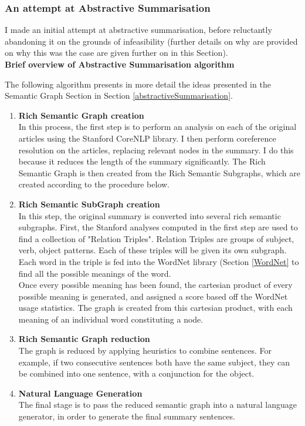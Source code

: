 \documentclass[12pt]{article}
\begin{document}
\subsubsection{An attempt at Abstractive Summarisation}

\label{abstractiveimplementation}

I made an initial attempt at abstractive summarisation, before reluctantly abandoning it on the grounds of infeasibility (further details on why are provided on why this was the case are given further on in this Section). \\

\textbf{Brief overview of Abstractive Summarisation algorithm}

The following algorithm presents in more detail the ideas presented in the Semantic Graph Section in Section \ref{abstractiveSummarisation}. \\

\begin{enumerate}
	\item \textbf{Rich Semantic Graph creation} \\ 
	In this process, the first step is to perform an analysis on each of the original articles using the Stanford CoreNLP library. I then perform coreference resolution on the articles, replacing relevant nodes in the summary. I do this because it reduces the length of the summary significantly. The Rich Semantic Graph is then created from the Rich Semantic Subgraphs, which are created according to the procedure below. 
	\item \textbf{Rich Semantic SubGraph creation} \\
	In this step, the original summary is converted into several rich semantic subgraphs. First, the Stanford analyses computed in the first step are used to find a collection of "Relation Triples". Relation Triples are groups of subject, verb, object patterns. Each of these triples will be given its own subgraph. Each word in the triple is fed into the WordNet library (Section \ref{WordNet} to find all the possible meanings of the word. \\
	Once every possible meaning has been found, the cartesian product of every possible meaning is generated, and assigned a score based off the WordNet usage statistics. The graph is created from this cartesian product, with each meaning of an individual word constituting a node. 
	\item \textbf{Rich Semantic Graph reduction} \\
	The graph is reduced by applying heuristics to combine sentences. For example, if two consecutive sentences both have the same subject, they can be combined into one sentence, with a conjunction for the object. 
	\item \textbf{Natural Language Generation}\\
	The final stage is to pass the reduced semantic graph into a natural language generator, in order to generate the final summary sentences.\\
\end{enumerate}
\end{document}
